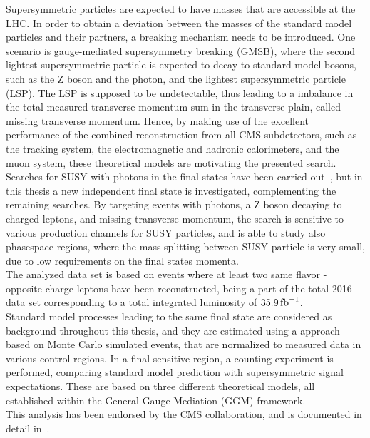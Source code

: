 Supersymmetric particles are expected to have masses that are accessible at the LHC. In order to obtain a deviation between the masses of the standard model particles and their partners, a breaking mechanism needs to be introduced. One scenario is gauge-mediated supersymmetry breaking (GMSB), where the second lightest supersymmetric particle is expected to decay to standard model bosons, such as the Z boson and the photon, and the lightest supersymmetric particle (LSP). The LSP is supposed to be undetectable, thus leading to a imbalance in the total measured transverse momentum sum in the transverse plain, called missing transverse momentum. Hence, by making use of the excellent performance of the combined reconstruction from all CMS subdetectors, such as the tracking system, the electromagnetic and hadronic calorimeters, and the muon system, these theoretical models are motivating the presented search.\\
Searches for SUSY with photons in the final states have been carried out~\cite{PhotonHT,PhotonMet,PhotonBJet,PhotonLepton}, but in this thesis a new independent final state is investigated, complementing the remaining searches. By targeting events with photons, a Z boson decaying to charged leptons, and missing transverse momentum, the search is sensitive to various production channels for SUSY particles, and is able to study also phasespace regions, where the mass splitting between SUSY particle is very small, due to low requirements on the final states momenta.\\
The analyzed data set is based on events where at least two same flavor - opposite charge leptons have been reconstructed, being a part of the total 2016 data set corresponding to a total integrated luminosity of $35.9\mbox{\ensuremath{\,\text{fb}^\text{$-$1}}}$.\\
Standard model processes leading to the same final state are considered as background throughout this thesis, and they are estimated using a approach based on Monte Carlo simulated events, that are normalized to measured data in various control regions. In a final sensitive region, a counting experiment is performed, comparing standard model prediction with supersymmetric signal expectations. These are based on three different theoretical models, all established within the General Gauge Mediation (GGM) framework.\\
This analysis has been endorsed by the CMS collaboration, and is documented in detail in~\cite{MyAN}.
